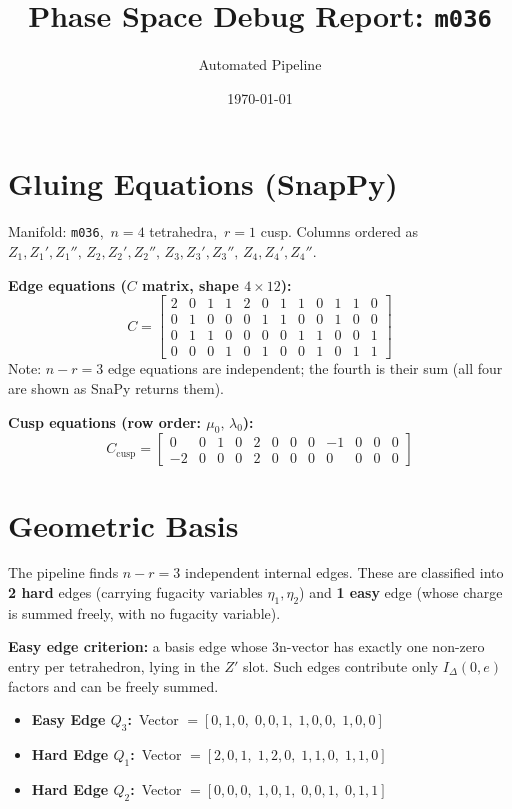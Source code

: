 \documentclass[12pt]{article}
\begin{document}
\title{Phase Space Debug Report: \texttt{m036}}
\author{Automated Pipeline}
\date{\today}
\maketitle

\section{Gluing Equations (SnapPy)}
Manifold: \texttt{m036},\ $n = 4$ tetrahedra,\ $r = 1$ cusp.
Columns ordered as $Z_1, Z_1', Z_1'',\, Z_2, Z_2', Z_2'',\, Z_3, Z_3', Z_3'',\, Z_4, Z_4', Z_4''$.

\textbf{Edge equations ($C$ matrix, shape $4 \times 12$):}
\[ C = \begin{bmatrix}
2 & 0 & 1 & 1 & 2 & 0 & 1 & 1 & 0 & 1 & 1 & 0 \\
0 & 1 & 0 & 0 & 0 & 1 & 1 & 0 & 0 & 1 & 0 & 0 \\
0 & 1 & 1 & 0 & 0 & 0 & 0 & 1 & 1 & 0 & 0 & 1 \\
0 & 0 & 0 & 1 & 0 & 1 & 0 & 0 & 1 & 0 & 1 & 1
\end{bmatrix} \]
Note: $n - r = 3$ edge equations are independent; the fourth is their sum
(all four are shown as SnaPy returns them).

\textbf{Cusp equations (row order: $\mu_0,\, \lambda_0$):}
\[ C_{\mathrm{cusp}} = \begin{bmatrix}
 0 &  0 &  1 &  0 &  2 &  0 &  0 &  0 & -1 &  0 &  0 &  0 \\
-2 &  0 &  0 &  0 &  2 &  0 &  0 &  0 &  0 &  0 &  0 &  0
\end{bmatrix} \]

\section{Geometric Basis}
The pipeline finds $n - r = 3$ independent internal edges.
These are classified into \textbf{2 hard} edges (carrying fugacity variables $\eta_1, \eta_2$)
and \textbf{1 easy} edge (whose charge is summed freely, with no fugacity variable).

\textbf{Easy edge criterion:} a basis edge whose 3n-vector has exactly one non-zero
entry per tetrahedron, lying in the $Z'$ slot.  Such edges contribute only
$I_\Delta(0,e)$ factors and can be freely summed.

\begin{itemize}
    \item \textbf{Easy Edge $Q_3$:}\ Vector $= [0,1,0,\; 0,0,1,\; 1,0,0,\; 1,0,0]$
    \item \textbf{Hard Edge $Q_1$:}\ Vector $= [2,0,1,\; 1,2,0,\; 1,1,0,\; 1,1,0]$
    \item \textbf{Hard Edge $Q_2$:}\ Vector $= [0,0,0,\; 1,0,1,\; 0,0,1,\; 0,1,1]$
\end{itemize}
\end{document}

